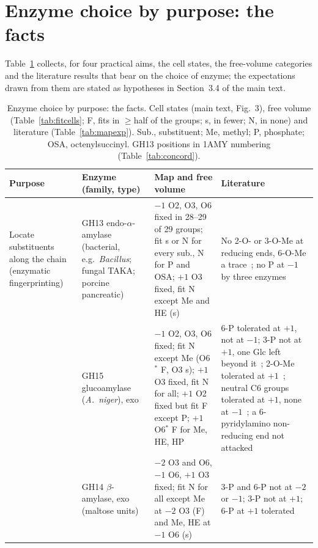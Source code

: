 \documentclass[preprint,12pt]{elsarticle}
\begin{document}
\section{Enzyme choice by purpose: the facts}\label{sec:purpose}
Table~\ref{tab:purpose} collects, for four practical aims, the cell states, the free-volume categories and the
literature results that bear on the choice of enzyme; the expectations drawn from them are stated as hypotheses in
Section~3.4 of the main text.

\begin{table}
\centering\renewcommand{\baselinestretch}{1}\renewcommand{\arraystretch}{0.95}\scriptsize\setlength{\tabcolsep}{3pt}
\caption{Enzyme choice by purpose: the facts. Cell states (main text, Fig.~3), free volume (Table~\ref{tab:fitcells};
F, fits in $\ge$half of the groups; s, in fewer; N, in none) and literature (Table~\ref{tab:mapexp}). Sub.,
substituent; Me, methyl; P, phosphate; OSA, octenylsuccinyl. GH13 positions in 1AMY numbering (Table~\ref{tab:concord}).}
\label{tab:purpose}
\begin{tabular}{p{2.6cm}p{3.4cm}p{6.2cm}p{6.2cm}}
\toprule
Purpose & Enzyme (family, type) & Map and free volume & Literature\\
\midrule
Locate substituents along the chain (enzymatic fingerprinting) &
GH13 endo-$\alpha$-amylase (bacterial, e.g.\ \emph{Bacillus}; fungal TAKA; porcine pancreatic) &
$-1$ O2, O3, O6 fixed in 28--29 of 29 groups; fit s or N for every sub., N for P and OSA; $+1$ O3 fixed, fit N
except Me and HE (s) &
No 2-O- or 3-O-Me at reducing ends, 6-O-Me a trace~\citep{vanderBurgt1998}; no P at $-1$ by three
enzymes~\citep{Takeda1983,Takeda1987} \\
\addlinespace
 & GH15 glucoamylase (\emph{A.~niger}), exo &
$-1$ O2, O3, O6 fixed; fit N except Me (O6$^\ast$ F, O3 s); $+1$ O3 fixed, fit N for all; $+1$ O2 fixed but fit F
except P; $+1$ O6$^\ast$ F for Me, HE, HP &
6-P tolerated at $+1$, not at $-1$; 3-P not at $+1$, one Glc left beyond it~\citep{Takeda1983,Takeda1987};
2-O-Me tolerated at $+1$~\citep{Lemieux1996,Mischnick2001}; neutral C6 groups tolerated at $+1$, none at
$-1$~\citep{Bock1988}; a 6-pyridylamino non-reducing end not attacked~\citep{Omichi1988} \\
\addlinespace
 & GH14 $\beta$-amylase, exo (maltose units) &
$-2$ O3 and O6, $-1$ O6, $+1$ O3 fixed; fit N for all except Me at $-2$ O3 (F) and Me, HE at $-1$ O6 (s) &
3-P and 6-P not at $-2$ or $-1$; 3-P not at $+1$; 6-P at $+1$ tolerated~\citep{Takeda1987} \\

\end{tabular}
\end{table}
\end{document}
